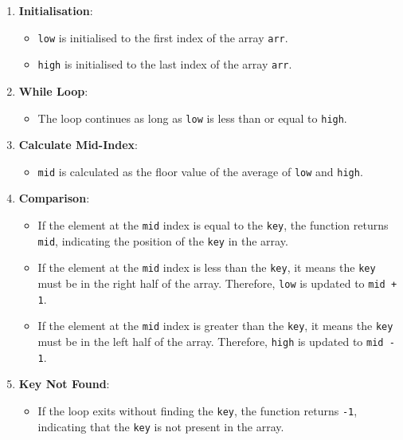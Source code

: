 \begin{enumerate}
    \item \textbf{Initialisation}:
        \begin{itemize}
            \item \texttt{low} is initialised to the first index of the array \texttt{arr}.
            \item \texttt{high} is initialised to the last index of the array \texttt{arr}.
        \end{itemize}
    \item \textbf{While Loop}:
        \begin{itemize}
            \item The loop continues as long as \texttt{low} is less than or equal to \texttt{high}.
        \end{itemize}
    \item \textbf{Calculate Mid-Index}:
        \begin{itemize}
            \item \texttt{mid} is calculated as the floor value of the average of \texttt{low} and \texttt{high}.
        \end{itemize}
    \item \textbf{Comparison}:
        \begin{itemize}
            \item If the element at the \texttt{mid} index is equal to the \texttt{key}, the function returns \texttt{mid}, indicating the position of the \texttt{key} in the array.
            \item If the element at the \texttt{mid} index is less than the \texttt{key}, it means the \texttt{key} must be in the right half of the array. Therefore, \texttt{low} is updated to \texttt{mid + 1}.
            \item If the element at the \texttt{mid} index is greater than the \texttt{key}, it means the \texttt{key} must be in the left half of the array. Therefore, \texttt{high} is updated to \texttt{mid - 1}.
        \end{itemize}
    \item \textbf{Key Not Found}:
        \begin{itemize}
            \item If the loop exits without finding the \texttt{key}, the function returns \texttt{-1}, indicating that the \texttt{key} is not present in the array.
        \end{itemize}
\end{enumerate}

